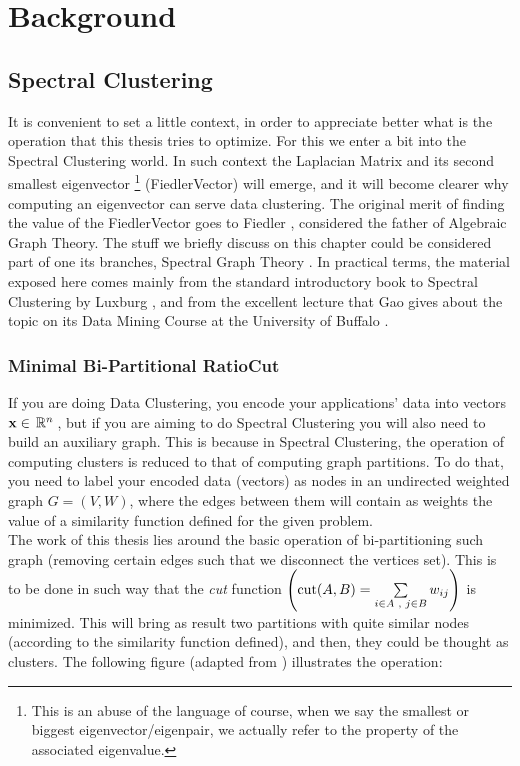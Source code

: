 \chapter{Background}
\label{cha:backg}

\section{Spectral Clustering}

It is convenient to set a little context, in order to appreciate
better what is the operation that this thesis tries to optimize. For
this we enter a bit into the Spectral Clustering world. In such
context the \gls{Laplacian} Matrix and its second smallest eigenvector
\footnote{This is an abuse of the language of course, when
we say the smallest or biggest eigenvector/eigenpair, we actually refer to
the property of the associated eigenvalue.}
(\gls{FiedlerVector}) will emerge, and it will become clearer why computing
an eigenvector can serve data clustering. The original merit of
finding the value of the \gls{FiedlerVector} goes to Fiedler
\cite{fiedler73}, considered the father of Algebraic Graph Theory. 
The stuff we briefly discuss on this chapter could be considered part
of one its branches, Spectral Graph Theory \cite{brouwer12}. In
practical terms, the material exposed here comes mainly from the
standard introductory book to Spectral Clustering by Luxburg \cite{luxburg07},
and from the excellent lecture that Gao gives about the topic on
its Data Mining Course at the University of Buffalo \cite{gao13}.

\subsection{Minimal Bi-Partitional RatioCut}

If you are doing Data Clustering, you encode your applications' data
into vectors $\mathbf{x} \in \,\mathbb{R}^{n}\,$, but if you are aiming to do Spectral
Clustering you will also need to build an auxiliary graph. This is
because in Spectral Clustering, the operation of computing clusters is
reduced to that of computing graph partitions. To do that, you need to
label your encoded data (vectors) as nodes in an undirected weighted graph $G =
(V,W)$, where the edges between them will contain as weights the value 
of a similarity function defined for the given problem. \\

The work of this thesis lies around the basic operation of
bi-partitioning such graph (removing certain edges such that we
disconnect the vertices set). This is to be done in such way that the
\emph{cut} function $\left(\operatorname{cut}(A,B) = \sum\limits_{\tiny{i \in A
    \ensuremath{\,\,,\,\,} j \in B}} w_{ij}\right)$ is minimized. This will bring as result
two partitions with quite similar nodes (according to the similarity
function defined), and then, they could be thought as clusters. The
following figure (adapted from \cite{gao13}) illustrates the
operation:

